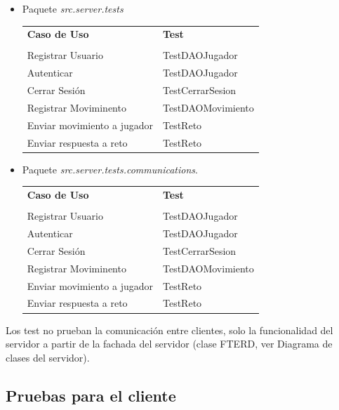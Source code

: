 \documentclass[a4paper,11pt,oneside]{article}
\begin{document}
\begin{itemize}
\item Paquete \emph{src.server.tests}

\begin{center}
{\footnotesize
\begin{tabularx}{0.95\textwidth}{p{}|X}

\textbf{Caso de Uso} & \textbf{Test} \\
& \\
Registrar Usuario & TestDAOJugador\\
Autenticar & TestDAOJugador\\
Cerrar Sesión & TestCerrarSesion\\
Registrar Moviminento & TestDAOMovimiento\\
Enviar movimiento a jugador & TestReto\\
Enviar respuesta a reto & TestReto\\
\end{tabularx}
}
\end{center}

\item Paquete \emph{src.server.tests.communications}.
\begin{center}
{\footnotesize
\begin{tabularx}{0.95\textwidth}{p{}|X}
\textbf{Caso de Uso} & \textbf{Test} \\
& \\
Registrar Usuario & TestDAOJugador\\
Autenticar & TestDAOJugador\\
Cerrar Sesión & TestCerrarSesion\\
Registrar Moviminento & TestDAOMovimiento\\
Enviar movimiento a jugador & TestReto\\
Enviar respuesta a reto & TestReto\\
\end{tabularx}
}
\end{center}
\end{itemize}

Los test no prueban la comunicación entre clientes, solo la funcionalidad del servidor a partir de la fachada del servidor (clase FTERD, ver Diagrama de clases del servidor).
\clearpage

\subsection{Pruebas para el cliente}



%
%
%
\end{document}
